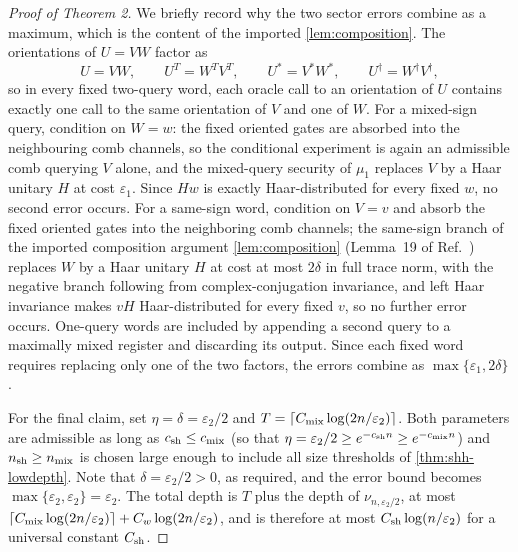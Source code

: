 \documentclass[
    aps,
    superscriptaddress,
    onecolumn,
    10pt,
    prx,
    nofootinbib
]{revtex4-2}
\theoremstyle{namedstatement}
\theoremstyle{plain}
\begin{document}
\begin{proof}[Proof of Theorem 2]
We briefly record why the two sector errors combine as a
maximum, which is the content of the imported \cref{lem:composition}. The
orientations of $U=VW$ factor as
\begin{equation}
    U=VW,
    \qquad
    U^{T}=W^{T}V^{T},
    \qquad
    U^{*}=V^{*}W^{*},
    \qquad
    U^{\dagger}=W^{\dagger}V^{\dagger},
    \label{eq:orientation-factorization}
\end{equation}
so in every fixed two-query word, each oracle call to an
orientation of $U$ contains exactly one call to the same orientation
of $V$ and one of $W$. For a mixed-sign query, condition on $W=w$: the
fixed oriented gates are absorbed into the neighbouring comb
channels, so the conditional experiment is again an admissible comb
querying $V$ alone, and the mixed-query security of $\mu_{1}$ replaces
$V$ by a Haar unitary $H$ at cost $\varepsilon_{1}$. Since $Hw$ is
exactly Haar-distributed for every fixed $w$, no second error occurs.
For a same-sign word, condition on $V=v$ and absorb the fixed oriented gates into the neighboring comb channels; the same-sign branch of the imported composition argument \cref{lem:composition} (Lemma~19 of Ref.~\cite{FolkertsmaEtAl2026}) replaces $W$ by a Haar unitary $H$ at cost at most $2\delta$ in full trace norm, with the negative branch following from complex-conjugation invariance, and left Haar invariance makes $vH$ Haar-distributed for every fixed $v$, so no further error occurs.
One-query words are included by appending a second query to a maximally mixed register and discarding its output. Since each fixed word
requires replacing only one of the two factors, the errors combine as
$\max\{\varepsilon_{1},2\delta\}$.

For the final claim, set $\eta=\delta=\varepsilon_{2}/2$ and
$T=\lceil C_{\rm mix}\log(2n/\varepsilon_{2})\rceil$. Both parameters
are admissible as long as $c_{\rm sh}\leq c_{\rm mix}$
(so that $\eta=\varepsilon_{2}/2\geq e^{-c_{\rm sh}n}\geq
e^{-c_{\rm mix}n}$) and $n_{\rm sh}\geq n_{\rm mix}$ is chosen large
enough to include all size thresholds of
\cref{thm:shh-lowdepth}. Note that $\delta=\varepsilon_{2}/2>0$, as
required, and the error bound becomes
$\max\{\varepsilon_{2},\varepsilon_{2}\}=\varepsilon_{2}$. The total
depth is $T$ plus the depth of $\nu_{n,\varepsilon_{2}/2}$, at
most $\lceil C_{\rm mix}\log(2n/\varepsilon_{2})\rceil
+C_{w}\log(2n/\varepsilon_{2})$, and is therefore at most
$C_{\rm sh}\log(n/\varepsilon_{2})$ for a universal constant
$C_{\rm sh}$.
\end{proof}
\end{document}
